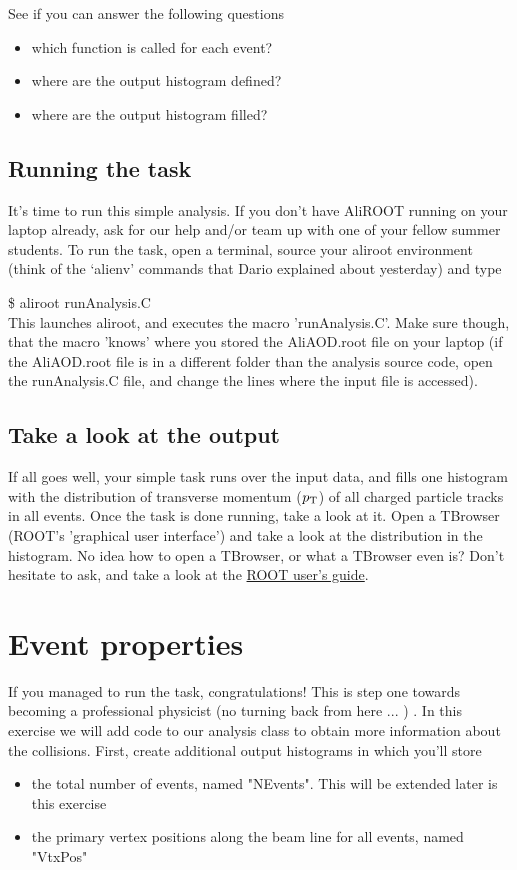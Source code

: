 \documentclass{article}
\begin{document}
See if you can answer the following questions
\begin{itemize}
\item which function is called for each event?
\item where are the output histogram defined?
\item where are the output histogram filled?
\end{itemize}

\subsection{Running the task}
It's time to run this simple analysis. If you don't have AliROOT running on your laptop already, ask for our help and/or team up with one of your fellow summer students. To run the task, open a terminal, source your aliroot environment (think of the `alienv' commands that Dario explained about yesterday) and type

\$ aliroot runAnalysis.C\\

This launches aliroot, and executes the macro 'runAnalysis.C'. Make sure though, that the macro 'knows' where you stored the AliAOD.root file on your laptop (if the AliAOD.root file is in a different folder than the analysis source code, open the runAnalysis.C file, and change the lines where the input file is accessed). 


\subsection{Take a look at the output}
If all goes well, your simple task runs over the input data, and fills one histogram with the distribution of transverse momentum ($p_{\rm T}$) of all charged particle tracks in all events. Once the task is done running, take a look at it. Open a TBrowser (ROOT's 'graphical user interface') and take a look at the distribution in the histogram. No idea how to open a TBrowser, or what a TBrowser even is? Don't hesitate to ask, and take a look at the \href{https://root.cern.ch/root/htmldoc/guides/users-guide/ROOTUsersGuide.html}{ROOT user's guide}.

\section{Event properties}

If you managed to run the task, congratulations! This is step one towards becoming a professional physicist (no turning back from here ... ) .   In this exercise we will add code to our analysis class to obtain more information about the collisions. First, create additional output histograms in which you'll store
\begin{itemize}
\item the total number of events, named "NEvents". This will be extended later is this exercise
\item the primary vertex positions along the beam line for all events, named "VtxPos"
\end{itemize}
\end{document}
